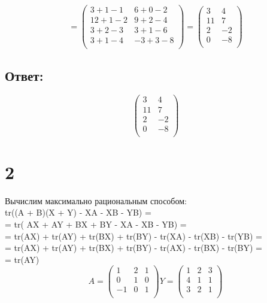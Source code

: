 \documentclass[a4paper]{article}
\begin{document}
\begin{equation*}=
\begin{pmatrix}
3+1-1 &6+0-2\\
12+1-2&9+2-4\\
3+2-3&3+1-6\\
3+1-4&-3+3-8\\
\end{pmatrix}=
\begin{pmatrix}
3 &4\\
11&7\\
2&-2\\
0&-8\\
\end{pmatrix}
\end{equation*}
\subsection*{Ответ:}
\begin{equation*}
\begin{pmatrix}
3 &4\\
11&7\\
2&-2\\
0&-8\\
\end{pmatrix}
\end{equation*}
















\section*{2}
Вычислим максимально рациональным способом:\\
 tr((A + B)(X + Y) - XA - XB - YB)  =\\
= tr( AX + AY + BX + BY - XA - XB - YB) = \\
= tr(AX) + tr(AY) + tr(BX) + tr(BY) - tr(XA) - tr(XB) - tr(YB) = \\
= tr(AX) + tr(AY) + tr(BX) + tr(BY) - tr(AX) - tr(BX) - tr(BY) = \\
= tr(AY)  
\begin{equation*}
A = 
\begin{pmatrix}
1 &2&1\\
0&1&0\\
-1&0&1\\
\end{pmatrix}    Y = 
\begin{pmatrix}
1 &2&3\\
4&1&1\\
3&2&1\\
\end{pmatrix}
\end{equation*}
\end{document}
